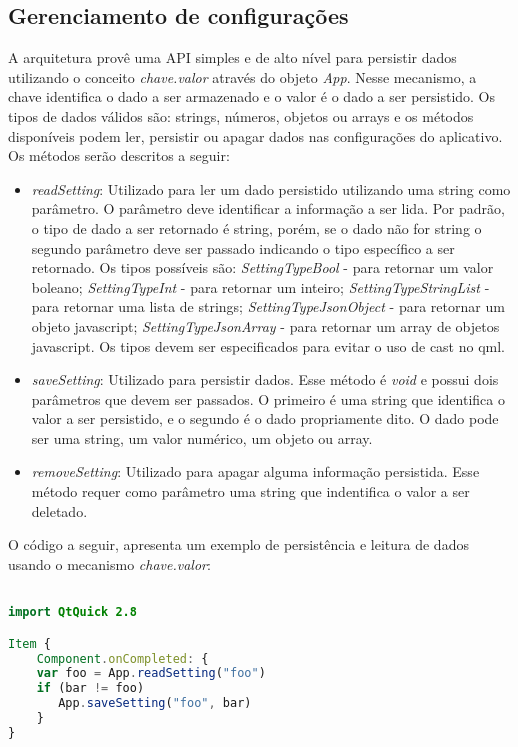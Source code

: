 \subsection{Gerenciamento de configurações}
A arquitetura provê uma API simples e de alto nível para persistir dados utilizando o conceito \textit{chave.valor} através do objeto \textit{App}. Nesse mecanismo, a chave identifica o dado a ser armazenado e o valor é o dado a ser persistido. Os tipos de dados válidos são: strings, números, objetos ou arrays e os métodos disponíveis podem ler, persistir ou apagar dados nas configurações do aplicativo. Os métodos serão descritos a seguir:
	\begin{itemize}
		\item \textit{readSetting}: Utilizado para ler um dado persistido utilizando uma string como parâmetro. O parâmetro deve identificar a informação a ser lida. Por padrão, o tipo de dado a ser retornado é string, porém, se o dado não for string o segundo parâmetro deve ser passado indicando o tipo específico a ser retornado. Os tipos possíveis são: \textit{SettingTypeBool} - para retornar um valor boleano; \textit{SettingTypeInt} - para retornar um inteiro; \textit{SettingTypeStringList} - para retornar uma lista de strings; \textit{SettingTypeJsonObject} - para retornar um objeto javascript; \textit{SettingTypeJsonArray} - para retornar um array de objetos javascript. Os tipos devem ser especificados para evitar o uso de cast no qml.

		\item \textit{saveSetting}: Utilizado para persistir dados. Esse método é \textit{void} e possui dois parâmetros que devem ser passados. O primeiro é uma string que identifica o valor a ser persistido, e o segundo é o dado propriamente dito. O dado pode ser uma string, um valor numérico, um objeto ou array.

		\item \textit{removeSetting}: Utilizado para apagar alguma informação persistida. Esse método requer como parâmetro uma string que indentifica o valor a ser deletado.
	\end{itemize}

O código a seguir, apresenta um exemplo de persistência e leitura de dados usando o mecanismo \textit{chave.valor}:

\begin{center}
\begin{lstlisting}[language=qml]

import QtQuick 2.8

Item {
    Component.onCompleted: {
	var foo = App.readSetting("foo")
	if (bar != foo)
	   App.saveSetting("foo", bar)
    }
}
\end{lstlisting}
\end{center}


